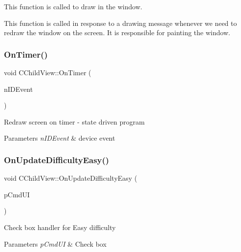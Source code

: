 This function is called to draw in the window.

This function is called in response to a drawing message whenever we need to redraw the window on the screen. It is responsible for painting the window. \mbox{\label{class_c_child_view_a4c6bb8bd631cee84bb80c948f3d6d98a}} 
\subsubsection{\texorpdfstring{OnTimer()}{OnTimer()}}
{\footnotesize\ttfamily void C\+Child\+View\+::\+On\+Timer (\begin{DoxyParamCaption}\item[{U\+I\+N\+T\+\_\+\+P\+TR}]{n\+I\+D\+Event }\end{DoxyParamCaption})}

Redraw screen on timer -\/ state driven program


\begin{DoxyParams}{Parameters}
{\em n\+I\+D\+Event} & device event \\
\hline
\end{DoxyParams}
\mbox{\label{class_c_child_view_a881809e1f085e134ddb31a76cb7b72d4}} 
\subsubsection{\texorpdfstring{OnUpdateDifficultyEasy()}{OnUpdateDifficultyEasy()}}
{\footnotesize\ttfamily void C\+Child\+View\+::\+On\+Update\+Difficulty\+Easy (\begin{DoxyParamCaption}\item[{C\+Cmd\+UI $\ast$}]{p\+Cmd\+UI }\end{DoxyParamCaption})}

Check box handler for Easy difficulty 
\begin{DoxyParams}{Parameters}
{\em p\+Cmd\+UI} & Check box \\
\hline
\end{DoxyParams}
\mbox{\label{class_c_child_view_a77809df4958d80ea45a09c4d3f3412e7}} 
